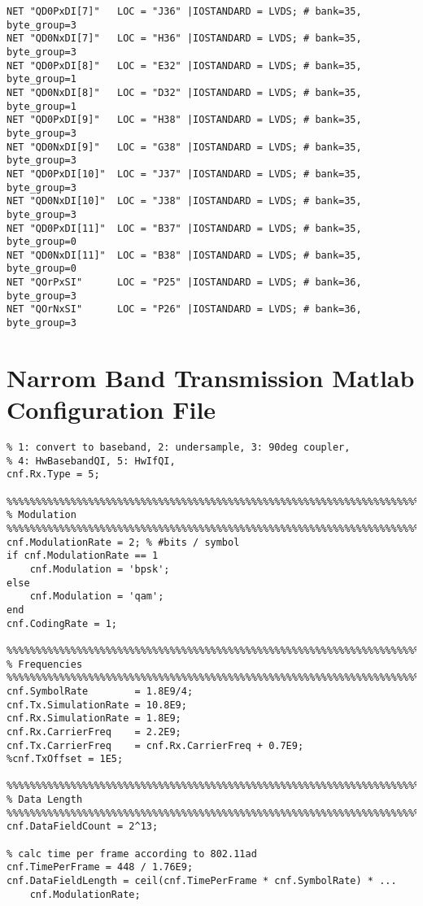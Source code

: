 \begin{appendix}
\begin{verbatim}
NET "QD0PxDI[7]"   LOC = "J36" |IOSTANDARD = LVDS; # bank=35, byte_group=3
NET "QD0NxDI[7]"   LOC = "H36" |IOSTANDARD = LVDS; # bank=35, byte_group=3
NET "QD0PxDI[8]"   LOC = "E32" |IOSTANDARD = LVDS; # bank=35, byte_group=1
NET "QD0NxDI[8]"   LOC = "D32" |IOSTANDARD = LVDS; # bank=35, byte_group=1
NET "QD0PxDI[9]"   LOC = "H38" |IOSTANDARD = LVDS; # bank=35, byte_group=3
NET "QD0NxDI[9]"   LOC = "G38" |IOSTANDARD = LVDS; # bank=35, byte_group=3
NET "QD0PxDI[10]"  LOC = "J37" |IOSTANDARD = LVDS; # bank=35, byte_group=3
NET "QD0NxDI[10]"  LOC = "J38" |IOSTANDARD = LVDS; # bank=35, byte_group=3
NET "QD0PxDI[11]"  LOC = "B37" |IOSTANDARD = LVDS; # bank=35, byte_group=0
NET "QD0NxDI[11]"  LOC = "B38" |IOSTANDARD = LVDS; # bank=35, byte_group=0
NET "QOrPxSI"      LOC = "P25" |IOSTANDARD = LVDS; # bank=36, byte_group=3
NET "QOrNxSI"      LOC = "P26" |IOSTANDARD = LVDS; # bank=36, byte_group=3
\end{verbatim}

\chapter{Narrom Band Transmission Matlab Configuration File}
\label{app:res_450_cnf}
\begin{verbatim}
% 1: convert to baseband, 2: undersample, 3: 90deg coupler,
% 4: HwBasebandQI, 5: HwIfQI,
cnf.Rx.Type = 5;

%%%%%%%%%%%%%%%%%%%%%%%%%%%%%%%%%%%%%%%%%%%%%%%%%%%%%%%%%%%%%%%%%%%%%%%%%%%%%%%%
% Modulation
%%%%%%%%%%%%%%%%%%%%%%%%%%%%%%%%%%%%%%%%%%%%%%%%%%%%%%%%%%%%%%%%%%%%%%%%%%%%%%%%
cnf.ModulationRate = 2; % #bits / symbol
if cnf.ModulationRate == 1
    cnf.Modulation = 'bpsk';
else
    cnf.Modulation = 'qam';
end
cnf.CodingRate = 1;

%%%%%%%%%%%%%%%%%%%%%%%%%%%%%%%%%%%%%%%%%%%%%%%%%%%%%%%%%%%%%%%%%%%%%%%%%%%%%%%%
% Frequencies
%%%%%%%%%%%%%%%%%%%%%%%%%%%%%%%%%%%%%%%%%%%%%%%%%%%%%%%%%%%%%%%%%%%%%%%%%%%%%%%%
cnf.SymbolRate        = 1.8E9/4;
cnf.Tx.SimulationRate = 10.8E9;
cnf.Rx.SimulationRate = 1.8E9;
cnf.Rx.CarrierFreq    = 2.2E9;
cnf.Tx.CarrierFreq    = cnf.Rx.CarrierFreq + 0.7E9;
%cnf.TxOffset = 1E5;

%%%%%%%%%%%%%%%%%%%%%%%%%%%%%%%%%%%%%%%%%%%%%%%%%%%%%%%%%%%%%%%%%%%%%%%%%%%%%%%%
% Data Length
%%%%%%%%%%%%%%%%%%%%%%%%%%%%%%%%%%%%%%%%%%%%%%%%%%%%%%%%%%%%%%%%%%%%%%%%%%%%%%%%
cnf.DataFieldCount = 2^13;

% calc time per frame according to 802.11ad
cnf.TimePerFrame = 448 / 1.76E9;
cnf.DataFieldLength = ceil(cnf.TimePerFrame * cnf.SymbolRate) * ...
    cnf.ModulationRate;


\end{verbatim}
\end{appendix}
